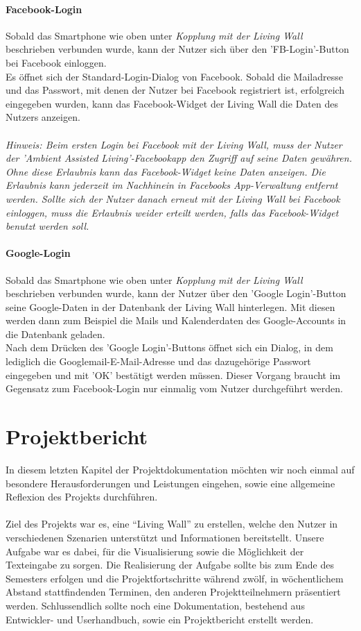 \documentclass[10pt,a4paper]{report}
\begin{document}
		\subsubsection{Facebook-Login}
		Sobald das Smartphone wie oben unter \textit{Kopplung mit der Living Wall} beschrieben verbunden wurde, kann der Nutzer sich über den 'FB-Login'-Button bei Facebook einloggen.\\
Es öffnet sich der Standard-Login-Dialog von Facebook. Sobald die Mailadresse und das Passwort, mit denen der Nutzer bei Facebook registriert ist, erfolgreich eingegeben wurden, kann das Facebook-Widget der Living Wall die Daten des Nutzers anzeigen.\\ \\
		\textit{Hinweis: Beim ersten Login bei Facebook mit der Living Wall, muss der Nutzer der 'Ambient Assisted Living'-Facebookapp den Zugriff auf seine Daten gewähren. Ohne diese Erlaubnis kann das Facebook-Widget keine Daten anzeigen. Die Erlaubnis kann jederzeit im Nachhinein in Facebooks App-Verwaltung entfernt werden. Sollte sich der Nutzer danach erneut mit der Living Wall bei Facebook einloggen, muss die Erlaubnis weider erteilt werden, falls das Facebook-Widget benutzt werden soll.}
		\subsubsection{Google-Login}
		Sobald das Smartphone wie oben unter \textit{Kopplung mit der Living Wall} beschrieben verbunden wurde, kann der Nutzer über den 'Google Login'-Button seine Google-Daten in der Datenbank der Living Wall hinterlegen. Mit diesen werden dann zum Beispiel die Mails und Kalenderdaten des Google-Accounts in die Datenbank geladen.\\
Nach dem Drücken des 'Google Login'-Buttons öffnet sich ein Dialog, in dem lediglich die Googlemail-E-Mail-Adresse und das dazugehörige Passwort eingegeben und mit 'OK' bestätigt werden müssen. Dieser Vorgang braucht im Gegensatz zum Facebook-Login nur einmalig vom Nutzer durchgeführt werden.

\chapter{Projektbericht}
	In diesem letzten Kapitel der Projektdokumentation möchten wir noch einmal auf besondere Herausforderungen und Leistungen eingehen, sowie eine allgemeine Reflexion des Projekts durchführen.\\\\
	Ziel des Projekts war es, eine "`Living Wall"' zu erstellen, welche den Nutzer in verschiedenen Szenarien unterstützt und Informationen bereitstellt. Unsere Aufgabe war es dabei, für die Visualisierung sowie die Möglichkeit der Texteingabe zu sorgen. Die Realisierung der Aufgabe sollte bis zum Ende des Semesters erfolgen und die Projektfortschritte während zwölf, in wöchentlichem Abstand stattfindenden Terminen, den anderen Projektteilnehmern präsentiert werden. Schlussendlich sollte noch eine Dokumentation, bestehend aus Entwickler- und Userhandbuch, sowie ein Projektbericht erstellt werden.
	
\end{document}

